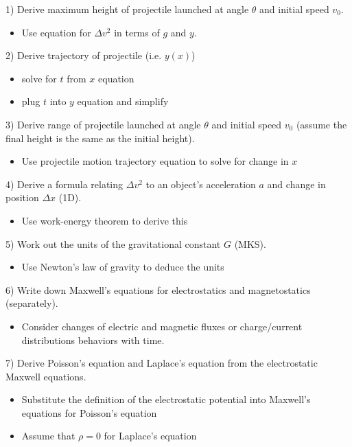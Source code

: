 \documentclass{article}
\begin{document}
   

1) Derive maximum height of projectile launched at angle $\theta$ and initial speed $v_{0}$.
\begin{itemize}    
    \item Use equation for $\Delta v^2$ in terms of $g$ and $y$.
\end{itemize}

\newpage

2) Derive trajectory of projectile (i.e. $y(x)$)

\begin{itemize}
    \item solve for $t$ from $x$ equation
    \item plug $t$ into $y$ equation and simplify
\end{itemize}

\newpage 

3) Derive range of projectile launched at angle $\theta$ and initial speed $v_{0}$ (assume the final height is the same as the initial height).
\begin{itemize}
\item Use projectile motion trajectory equation to solve for change in $x$
\end{itemize}

\newpage


4) Derive a formula relating $\Delta v^2$ to an object's acceleration $a$ and change in position $\Delta x$ (1D).
\begin{itemize}
    \item Use work-energy theorem to derive this
\end{itemize}

\newpage

5) Work out the units of the gravitational constant $G$ (MKS).
\begin{itemize}
    \item Use Newton's law of gravity to deduce the units 
\end{itemize}

\newpage

6) Write down Maxwell's equations for electrostatics and magnetostatics (separately).
\begin{itemize}
    \item Consider changes of electric and magnetic fluxes or charge/current distributions behaviors with time. 
\end{itemize}

\newpage

7) Derive Poisson's equation and Laplace's equation from the electrostatic Maxwell equations.
\begin{itemize}
    \item Substitute the definition of the electrostatic potential into Maxwell's equations for Poisson's equation
    \item Assume that $\rho = 0$ for Laplace's equation
\end{itemize}
\end{document}
